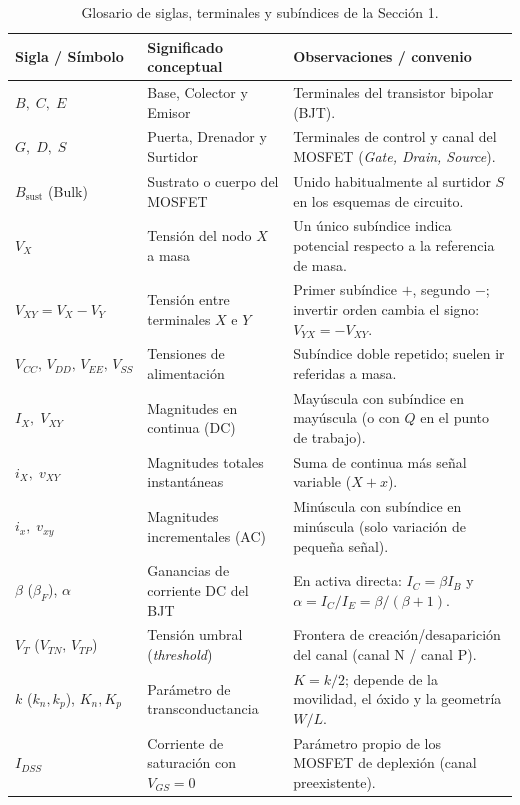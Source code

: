 \documentclass[11pt,a4paper]{article}
\begin{document}
	\begin{table}[H]
		\centering
		\footnotesize
		\begin{tabularx}{\textwidth}{@{}>{\raggedright\arraybackslash}p{3.4cm} >{\raggedright\arraybackslash}p{4.6cm} >{\raggedright\arraybackslash}X@{}}
			\toprule
			\rowcolor{mainblue!15}
			\textbf{Sigla / Símbolo} & \textbf{Significado conceptual} & \textbf{Observaciones / convenio} \\
			\midrule
			$B,\; C,\; E$ & Base, Colector y Emisor & Terminales del transistor bipolar (BJT). \\
			$G,\; D,\; S$ & Puerta, Drenador y Surtidor & Terminales de control y canal del MOSFET (\emph{Gate, Drain, Source}). \\
			$B_{\text{sust}}$ (Bulk) & Sustrato o cuerpo del MOSFET & Unido habitualmente al surtidor $S$ en los esquemas de circuito. \\
			$V_X$ & Tensión del nodo $X$ a masa & Un único subíndice indica potencial respecto a la referencia de masa. \\
			$V_{XY} = V_X - V_Y$ & Tensión entre terminales $X$ e $Y$ & Primer subíndice $+$, segundo $-$; invertir orden cambia el signo: $V_{YX} = -V_{XY}$. \\
			$V_{CC},\, V_{DD},\, V_{EE},\, V_{SS}$ & Tensiones de alimentación & Subíndice doble repetido; suelen ir referidas a masa. \\
			$I_X,\; V_{XY}$ & Magnitudes en continua (DC) & Mayúscula con subíndice en mayúscula (o con $Q$ en el punto de trabajo). \\
			$i_X,\; v_{XY}$ & Magnitudes totales instantáneas & Suma de continua más señal variable ($X + x$). \\
			$i_x,\; v_{xy}$ & Magnitudes incrementales (AC) & Minúscula con subíndice en minúscula (solo variación de pequeña señal). \\
			$\beta$ ($\beta_F$),\; $\alpha$ & Ganancias de corriente DC del BJT & En activa directa: $I_C = \beta I_B$ y $\alpha = I_C / I_E = \beta / (\beta + 1)$. \\
			$V_T$ ($V_{TN},\, V_{TP}$) & Tensión umbral (\emph{threshold}) & Frontera de creación/desaparición del canal (canal N / canal P). \\
			$k$ ($k_n, k_p$),\; $K_n, K_p$ & Parámetro de transconductancia & $K = k/2$; depende de la movilidad, el óxido y la geometría $W/L$. \\
			$I_{DSS}$ & Corriente de saturación con $V_{GS}=0$ & Parámetro propio de los MOSFET de deplexión (canal preexistente). \\
			\bottomrule
		\end{tabularx}
		\caption{Glosario de siglas, terminales y subíndices de la Sección 1.}
	\end{table}
\end{document}
